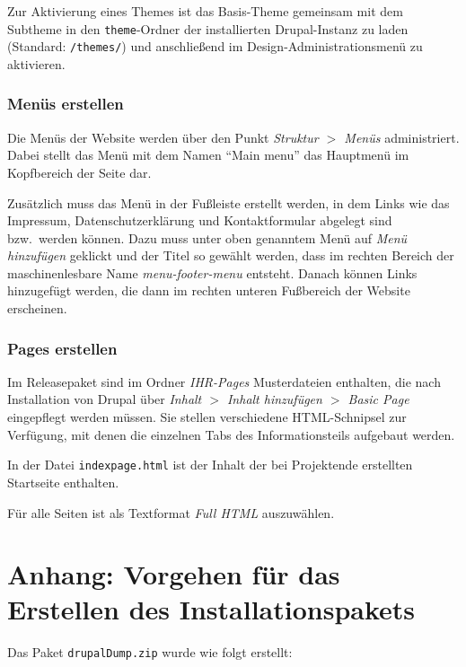 \documentclass[a4paper,11pt,twoside]{article}
\begin{document}
Zur Aktivierung eines Themes ist das Basis-Theme gemeinsam mit dem Subtheme in
den \texttt{theme}-Ordner der installierten Drupal-Instanz zu laden (Standard:
\texttt{/themes/}) und anschließend im Design-Administrationsmenü zu
aktivieren.

\subsubsection{Menüs erstellen}
Die Menüs der Website werden über den Punkt \textit{Struktur $>$ Menüs}
administriert. Dabei stellt das Menü mit dem Namen "`Main menu"' das Hauptmenü
im Kopfbereich der Seite dar.

Zusätzlich muss das Menü in der Fußleiste erstellt werden, in dem Links wie
das Impressum, Datenschutzerklärung und Kontaktformular abgelegt sind
bzw.\ werden können.  Dazu muss unter oben genanntem Menü auf \emph{Menü
  hinzufügen} geklickt und der Titel so gewählt werden, dass im rechten
Bereich der maschinenlesbare Name \textit{menu-footer-menu} entsteht. Danach
können Links hinzugefügt werden, die dann im rechten unteren Fußbereich der
Website erscheinen.

\subsubsection{Pages erstellen}
Im Releasepaket sind im Ordner \emph{IHR-Pages} Musterdateien enthalten, die
nach Installation von Drupal über \textit{Inhalt $>$ Inhalt hinzufügen $>$
  Basic Page} eingepflegt werden müssen. Sie stellen verschiedene
HTML-Schnipsel zur Verfügung, mit denen die einzelnen Tabs des
Informationsteils aufgebaut werden.

In der Datei \texttt{indexpage.html} ist der Inhalt der bei Projektende
erstellten Startseite enthalten. 

Für alle Seiten ist als Textformat \emph{Full HTML} auszuwählen.

\section{Anhang: Vorgehen für das Erstellen des Installationspakets}

Das Paket \texttt{drupalDump.zip} wurde wie folgt erstellt: 
\end{document}
